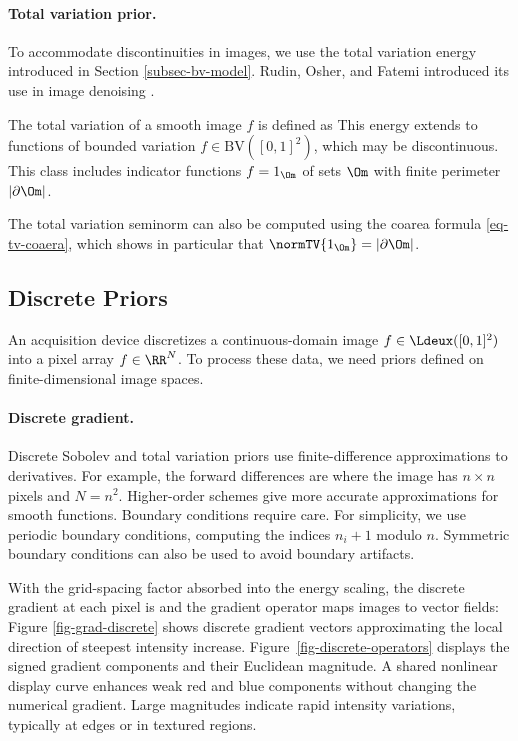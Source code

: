 \paragraph{Total variation prior.}

To accommodate discontinuities in images, we use the total variation energy introduced in Section \ref{subsec-bv-model}. Rudin, Osher, and Fatemi introduced its use in image denoising \cite{rudin-tv}.

The total variation of a smooth image $f$ is defined as 
This energy extends to functions of bounded variation $f \in \text{BV}([0,1]^2)$, which may be discontinuous. This class includes indicator functions $f=1_{\Om}$ of sets $\Om$ with finite perimeter $|\partial \Om|$.

The total variation seminorm can also be computed using the coarea formula \eqref{eq-tv-coaera}, which shows in particular that $\normTV{1_{\Om}} = |\partial \Om|$.


\subsection{Discrete Priors}
\label{subsec-disc-priors}

An acquisition device discretizes a continuous-domain image $f \in \Ldeux([0,1]^2)$ into a pixel array $f \in \RR^N$. To process these data, we need priors defined on finite-dimensional image spaces.

\paragraph{Discrete gradient.}

Discrete Sobolev and total variation priors use finite-difference approximations to derivatives. For example, the forward differences are
where the image has $n\times n$ pixels and $N=n^2$. Higher-order schemes give more accurate approximations for smooth functions.
Boundary conditions require care. For simplicity, we use periodic boundary conditions, computing the indices $n_i+1$ modulo $n$. Symmetric boundary conditions can also be used to avoid boundary artifacts.

With the grid-spacing factor absorbed into the energy scaling, the discrete gradient at each pixel is
and the gradient operator maps images to vector fields:
Figure \ref{fig-grad-discrete} shows discrete gradient vectors approximating the local direction of steepest intensity increase. Figure~\ref{fig-discrete-operators} displays the signed gradient components and their Euclidean magnitude. A shared nonlinear display curve enhances weak red and blue components without changing the numerical gradient. Large magnitudes indicate rapid intensity variations, typically at edges or in textured regions.

